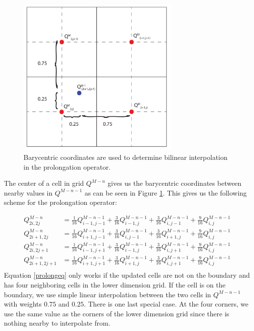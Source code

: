 \begin{figure}[ht!]
\centering
\includegraphics[width=80mm]{img/prolong.pdf}
\caption{Barycentric coordinates are used to determine bilinear interpolation in the prolongation operator.}
\label{prolong}
\end{figure}
\noindent
The center of a cell in grid $Q^{M-n}$ gives us the barycentric coordinates between nearby values in $Q^{M-n-1}$ as can be seen in Figure \ref{prolong}. This gives us the following scheme for the prolongation operator:

\begin{equation}
\begin{split}
Q^{M-n}_{2i,2j} &= \frac{1}{16} Q^{M-n-1}_{i-1,j-1} +  \frac{3}{16} Q^{M-n-1}_{i-1,j} +  \frac{3}{16} Q^{M-n-1}_{i,j-1}+  \frac{9}{16} Q^{M-n-1}_{i,j} \\ 
Q^{M-n}_{2i + 1,2j} &= \frac{1}{16} Q^{M-n-1}_{i+1,j-1} +  \frac{3}{16} Q^{M-n-1}_{i,j-1} +  \frac{3}{16} Q^{M-n-1}_{i+1,j}+  \frac{9}{16} Q^{M-n-1}_{i,j} \\ 
Q^{M-n}_{2i,2j+1} &= \frac{1}{16} Q^{M-n-1}_{i-1,j+1} +  \frac{3}{16} Q^{M-n-1}_{i-1,j} +  \frac{3}{16} Q^{M-n-1}_{i,j+1}+  \frac{9}{16} Q^{M-n-1}_{i,j} \\ 
Q^{M-n}_{2i+1,2j+1} &= \frac{1}{16} Q^{M-n-1}_{i+1,j+1} +  \frac{3}{16} Q^{M-n-1}_{i+1,j} +  \frac{3}{16} Q^{M-n-1}_{i,j+1}+  \frac{9}{16} Q^{M-n-1}_{i,j} \\ 
\end{split}
\label{prolongeq}
\end{equation}
\noindent
Equation \ref{prolongeq} only works if the updated cells are not on the boundary and has four neighboring cells in the lower dimension grid. If the cell is on the boundary, we use simple linear interpolation between the two cells in $Q^{M-n-1}$ with weights $0.75$ and $0.25$. There is one last special case. At the four corners, we use the same value as the corners of the lower dimension grid since there is nothing nearby to interpolate from.
